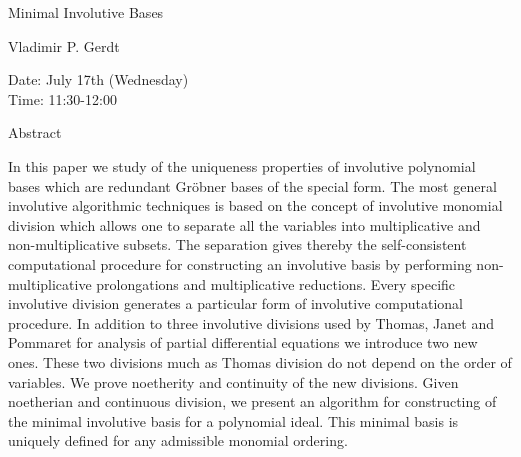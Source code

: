 \begin{center}
\LARGE
Minimal Involutive Bases

\end{center}

\begin{center}
\Large
Vladimir P. Gerdt

\end{center}

\noindent
Date:  July 17th (Wednesday)\\
Time:  11:30-12:00\\

\begin{center}
\large
Abstract
\end{center}

In this paper we study of the uniqueness properties of involutive polynomial bases which are
redundant Gr\"obner bases of the special form. The most general involutive algorithmic techniques
is based on the concept of involutive monomial division which allows one to separate all the
variables into multiplicative and non-multiplicative subsets. The separation gives thereby the
self-consistent computational procedure for constructing an involutive basis by performing
non-multiplicative prolongations and multiplicative reductions. Every specific involutive division
generates a particular form of involutive computational procedure. In addition to three involutive
divisions used by Thomas, Janet and Pommaret for analysis of partial differential equations we
introduce two new ones. These two divisions much as Thomas division do not depend on the order
of variables. We prove noetherity and continuity of the new divisions. Given noetherian and
continuous division, we present an algorithm for constructing of the minimal involutive basis for a
polynomial ideal. This minimal basis is uniquely defined for any admissible monomial ordering. 

